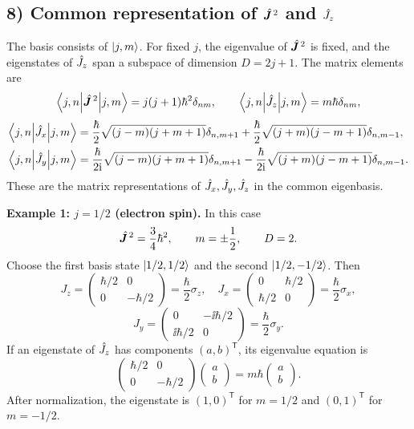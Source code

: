 \subsection*{8) Common representation of $\hat{\bm{J}}^{\,2}$ and $\hat{J}_z$}
The basis consists of $\left|j,m\right\rangle$. For fixed $j$, the eigenvalue of $\hat{\bm{J}}^{\,2}$ is fixed, and the eigenstates of $\hat{J}_z$ span a subspace of dimension $D=2j+1$. The matrix elements are
\begin{equation}
\left\langle j,n\middle|\hat{\bm{J}}^{\,2}\middle|j,m\right\rangle=j(j+1)\hbar^2\delta_{nm},\qquad
\left\langle j,n\middle|\hat{J}_z\middle|j,m\right\rangle=m\hbar\delta_{nm},
\end{equation}
\begin{equation}\begin{aligned}
\left\langle j,n\middle|\hat{J}_x\middle|j,m\right\rangle&=\frac\hbar2\sqrt{(j-m)(j+m+1)}\delta_{n,m+1}
+\frac\hbar2\sqrt{(j+m)(j-m+1)}\delta_{n,m-1},\\
\left\langle j,n\middle|\hat{J}_y\middle|j,m\right\rangle&=\frac\hbar{2\mathrm{i}}\sqrt{(j-m)(j+m+1)}\delta_{n,m+1}
-\frac\hbar{2\mathrm{i}}\sqrt{(j+m)(j-m+1)}\delta_{n,m-1}.
\end{aligned}\end{equation}
These are the matrix representations of $\hat{J}_x,\hat{J}_y,\hat{J}_z$ in the common eigenbasis.

\textbf{Example 1: $j=1/2$ (electron spin).} In this case
\begin{equation}
\hat{\bm{J}}^{\,2}=\frac34\hbar^2,\qquad m=\pm\frac12,\qquad D=2.
\end{equation}
Choose the first basis state $\left|1/2,1/2\right\rangle$ and the second $\left|1/2,-1/2\right\rangle$. Then
\begin{equation}
J_z=\begin{pmatrix}\hbar/2&0\\0&-\hbar/2\end{pmatrix}=\frac\hbar2\sigma_z,\quad
J_x=\begin{pmatrix}0&\hbar/2\\\hbar/2&0\end{pmatrix}=\frac\hbar2\sigma_x,
\end{equation}
\begin{equation}
J_y=\begin{pmatrix}0&-\ii\hbar/2\\\ii\hbar/2&0\end{pmatrix}=\frac\hbar2\sigma_y.
\end{equation}
If an eigenstate of $\hat{J}_z$ has components $(a,b)^{\mathsf T}$, its eigenvalue equation is
\begin{equation}
\begin{pmatrix}\hbar/2&0\\0&-\hbar/2\end{pmatrix}\begin{pmatrix}a\\b\end{pmatrix}
=m\hbar\begin{pmatrix}a\\b\end{pmatrix}.
\end{equation}
After normalization, the eigenstate is $(1,0)^{\mathsf T}$ for $m=1/2$ and $(0,1)^{\mathsf T}$ for $m=-1/2$.


